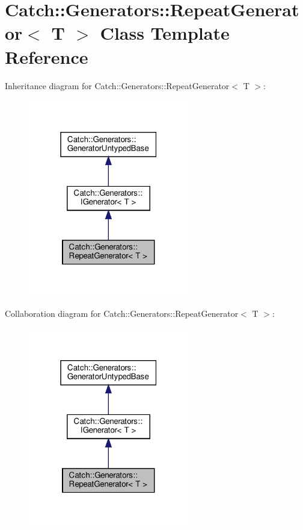 \hypertarget{classCatch_1_1Generators_1_1RepeatGenerator}{}\section{Catch\+:\+:Generators\+:\+:Repeat\+Generator$<$ T $>$ Class Template Reference}
\label{classCatch_1_1Generators_1_1RepeatGenerator}


Inheritance diagram for Catch\+:\+:Generators\+:\+:Repeat\+Generator$<$ T $>$\+:
\nopagebreak
\begin{figure}[H]
\begin{center}
\leavevmode
\includegraphics[width=199pt]{classCatch_1_1Generators_1_1RepeatGenerator__inherit__graph}
\end{center}
\end{figure}


Collaboration diagram for Catch\+:\+:Generators\+:\+:Repeat\+Generator$<$ T $>$\+:
\nopagebreak
\begin{figure}[H]
\begin{center}
\leavevmode
\includegraphics[width=199pt]{classCatch_1_1Generators_1_1RepeatGenerator__coll__graph}
\end{center}
\end{figure}
